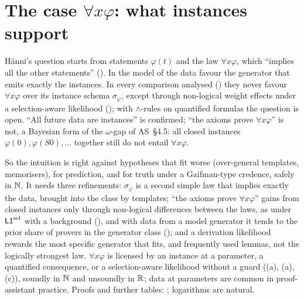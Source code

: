 
\section{The case \texorpdfstring{$\forall x\varphi$}{forall x phi}: what instances support}\label{sec:univ}

H\"anni's question starts from statements $\varphi(t)$ and the law $\forall x\varphi$, which ``implies all the other statements'' (). In the model of  the data favour the generator that emits exactly the instances. In every comparison analysed () they never favour $\forall x\varphi$ over its instance schema $\sigma_\varphi$, except through non-logical weight effects under a selection-aware likelihood (); with $\wedge$-rules on quantified formulas the question is open. ``All future data are instances'' is confirmed; ``the axioms prove $\forall x\varphi$'' is not, a Bayesian form of the $\omega$-gap of AS~\S4.5: all closed instances $\varphi(0),\varphi(S0),\dots$ together still do not entail $\forall x\varphi$.

So the intuition is right against hypotheses that fit worse (over-general templates, memorisers), for prediction, and for truth under a Gaifman-type credence, safely in $\mathbb{N}$. It needs three refinements: $\sigma_\varphi$ is a second simple law that implies exactly the data, brought into the class by templates; ``the axioms prove $\forall x\varphi$'' gains from closed instances only through non-logical differences between the laws, as under $\mathord{\mathsf{L1}}^{\mathrm{sel}}$ with a background (), and with data from a model generator it tends to the prior share of provers in the generator class (); and a derivation likelihood rewards the most specific generator that fits, and frequently used lemmas, not the logically strongest law. $\forall x\varphi$ is licensed by an instance at a parameter, a quantified consequence, or a selection-aware likelihood without a guard ((a), (a), (c)), soundly in $\mathbb{N}$ and unsoundly in $\mathbb{R}$; data at parameters are common in proof-assistant practice. Proofs and further tables: ; logarithms are natural.

